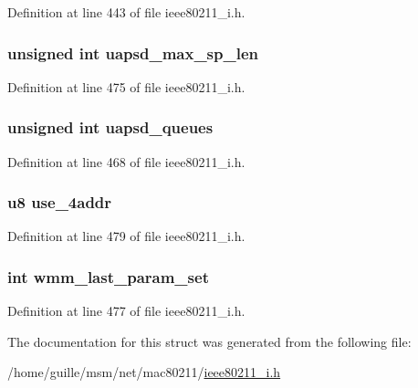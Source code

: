 Definition at line 443 of file ieee80211\-\_\-i.\-h.

\hypertarget{structieee80211__if__managed_a227154b39b6abc457693d962b19fd6c3}{
\subsubsection[{uapsd\-\_\-max\-\_\-sp\-\_\-len}]{\setlength{\rightskip}{0pt plus 5cm}unsigned int uapsd\-\_\-max\-\_\-sp\-\_\-len}}\label{structieee80211__if__managed_a227154b39b6abc457693d962b19fd6c3}


Definition at line 475 of file ieee80211\-\_\-i.\-h.

\hypertarget{structieee80211__if__managed_aae57668cf51c8e98a1238d7da802965d}{
\subsubsection[{uapsd\-\_\-queues}]{\setlength{\rightskip}{0pt plus 5cm}unsigned int uapsd\-\_\-queues}}\label{structieee80211__if__managed_aae57668cf51c8e98a1238d7da802965d}


Definition at line 468 of file ieee80211\-\_\-i.\-h.

\hypertarget{structieee80211__if__managed_a5c7e4a91e5f07e57a228e601b1cd4e29}{
\subsubsection[{use\-\_\-4addr}]{\setlength{\rightskip}{0pt plus 5cm}u8 use\-\_\-4addr}}\label{structieee80211__if__managed_a5c7e4a91e5f07e57a228e601b1cd4e29}


Definition at line 479 of file ieee80211\-\_\-i.\-h.

\hypertarget{structieee80211__if__managed_a5dd7a6f610fab30b1816d1a3f303da7e}{
\subsubsection[{wmm\-\_\-last\-\_\-param\-\_\-set}]{\setlength{\rightskip}{0pt plus 5cm}int wmm\-\_\-last\-\_\-param\-\_\-set}}\label{structieee80211__if__managed_a5dd7a6f610fab30b1816d1a3f303da7e}


Definition at line 477 of file ieee80211\-\_\-i.\-h.



The documentation for this struct was generated from the following file\-:\begin{DoxyCompactItemize}
\item 
/home/guille/msm/net/mac80211/\hyperlink{ieee80211__i_8h}{ieee80211\-\_\-i.\-h}\end{DoxyCompactItemize}
